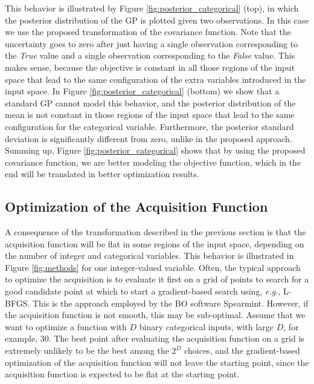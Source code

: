 This behavior is illustrated by Figure \ref{fig:posterior_categorical} (top), in which the posterior distribution of the GP is plotted
given two observations. In this case we use the proposed transformation of the covariance function.
Note that the uncertainty goes to zero after just having a single observation corresponding to
the \emph{True} value and a single observation corresponding to the \emph{False} value. This makes sense, because
the objective is constant in all those regions of the input space that lead to the same configuration of
the extra variables introduced in the input space. In Figure \ref{fig:posterior_categorical} (bottom) we show
that a standard GP cannot model this behavior, and the posterior distribution of the mean is not constant in
those regions of the input space that lead to the same configuration for the categorical variable.
Furthermore, the posterior standard deviation is significantly different from zero, unlike in the proposed approach.
Summing up, Figure \ref{fig:posterior_categorical} shows that by using the proposed covariance function, we are
better modeling the objective function, which in the end will be translated in better optimization results.

\subsection{Optimization of the Acquisition Function} \label{sec:acquisition}

A consequence of the transformation described in the previous section is that the
acquisition function will be flat in some regions of the input space, depending on the number of
integer and categorical variables. This behavior is illustrated in Figure \ref{fig:methods} for one
integer-valued variable. Often, the typical approach to optimize the acquisition is to evaluate it
first on a grid of points to search for a good candidate point at which to start a gradient-based search
using, \emph{e.g.}, L-BFGS. This is the approach employed by the BO software Spearmint. However, if the
acquisition function is not smooth, this may be sub-optimal. Assume that we want to optimize a function
with $D$ binary categorical inputs, with large $D$, for example, $30$. The best point after evaluating the
acquisition function on a grid is extremely unlikely to be the best among the $2^D$ choices, and the
gradient-based optimization of the acquisition function will not leave the starting point, since the
acquisition function is expected to be flat at the starting point.

